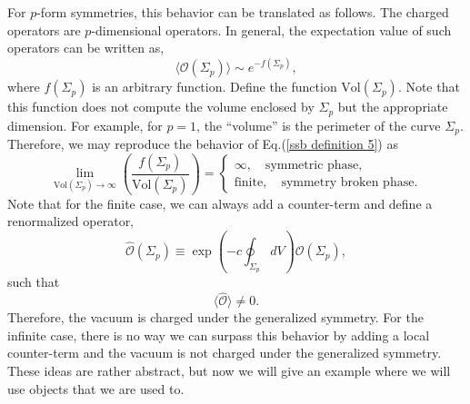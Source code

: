 \documentclass{article}
\begin{document}
For $p$-form symmetries, this behavior can be translated as follows. The charged operators are $p$-dimensional operators. In general, the expectation value of such operators can be written as, 
\begin{equation}
	\langle \mathcal{O}(\Sigma_p)\rangle \sim e^{-f(\Sigma_p)},
\end{equation}
where $f(\Sigma_p)$ is an arbitrary function. Define the function $\text{Vol}(\Sigma_p)$. Note that this function does not compute the volume enclosed by $\Sigma_p$ but the appropriate dimension. For example, for $p=1$, the ``volume'' is the perimeter of the curve $\Sigma_p$. Therefore, we may reproduce the behavior of Eq.(\ref{ssb definition 5}) as
\begin{equation}
	\lim_{\text{Vol}(\Sigma_p)\to\infty}\left(\frac{f(\Sigma_p)}{\text{Vol}(\Sigma_p)}\right)=\begin{cases}
		\infty,\quad\text{symmetric phase},\\
		\text{finite},\quad\text{{symmetry broken phase}}.
	\end{cases}
\end{equation}
Note that for the finite case, we can always add a counter-term and define a renormalized operator,
\begin{equation}
	\hat{\mathcal{O}}(\Sigma_p) \equiv \exp\left(-c\oint_{\Sigma_p}dV \right)\mathcal{O}(\Sigma_p),
\end{equation}
such that 
\begin{equation}
	\langle \hat{\mathcal{O}}\rangle \neq 0. 
\end{equation}
Therefore, the vacuum is charged under the generalized symmetry. For the infinite case, there is no way we can surpass this behavior by adding a local counter-term and the vacuum is not charged under the generalized symmetry. These ideas are rather abstract, but now we will give an example where we will use objects that we are used to. 
\end{document}
